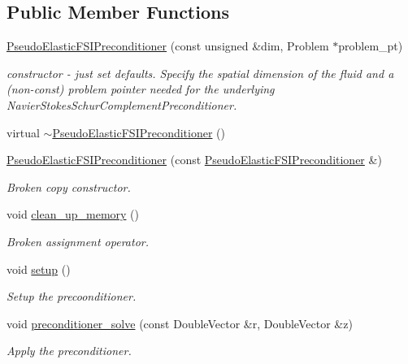 \subsection*{Public Member Functions}
\begin{DoxyCompactItemize}
\item 
\hyperlink{classoomph_1_1PseudoElasticFSIPreconditioner_aa3132ef3e4ecd57adf64da72e84b5d9d}{Pseudo\+Elastic\+F\+S\+I\+Preconditioner} (const unsigned \&dim, Problem $\ast$problem\+\_\+pt)
\begin{DoxyCompactList}\small\item\em constructor -\/ just set defaults. Specify the spatial dimension of the fluid and a (non-\/const) problem pointer needed for the underlying Navier\+Stokes\+Schur\+Complement\+Preconditioner. \end{DoxyCompactList}\item 
virtual \hyperlink{classoomph_1_1PseudoElasticFSIPreconditioner_a8f57b2dc7f9e37d419ead6b786dfac82}{$\sim$\+Pseudo\+Elastic\+F\+S\+I\+Preconditioner} ()
\item 
\hyperlink{classoomph_1_1PseudoElasticFSIPreconditioner_aa7efe57119bf77e503049922f8d16722}{Pseudo\+Elastic\+F\+S\+I\+Preconditioner} (const \hyperlink{classoomph_1_1PseudoElasticFSIPreconditioner}{Pseudo\+Elastic\+F\+S\+I\+Preconditioner} \&)
\begin{DoxyCompactList}\small\item\em Broken copy constructor. \end{DoxyCompactList}\item 
void \hyperlink{classoomph_1_1PseudoElasticFSIPreconditioner_a15859381010faa40a47fdca28b281475}{clean\+\_\+up\+\_\+memory} ()
\begin{DoxyCompactList}\small\item\em Broken assignment operator. \end{DoxyCompactList}\item 
void \hyperlink{classoomph_1_1PseudoElasticFSIPreconditioner_a460ad5eea59f4c07dfde8b11696fabb1}{setup} ()
\begin{DoxyCompactList}\small\item\em Setup the precoonditioner. \end{DoxyCompactList}\item 
void \hyperlink{classoomph_1_1PseudoElasticFSIPreconditioner_ad29c2852949caec2d20cbe7cf99f1b38}{preconditioner\+\_\+solve} (const Double\+Vector \&r, Double\+Vector \&z)
\begin{DoxyCompactList}\small\item\em Apply the preconditioner. \end{DoxyCompactList}\item 

\end{DoxyCompactItemize}
